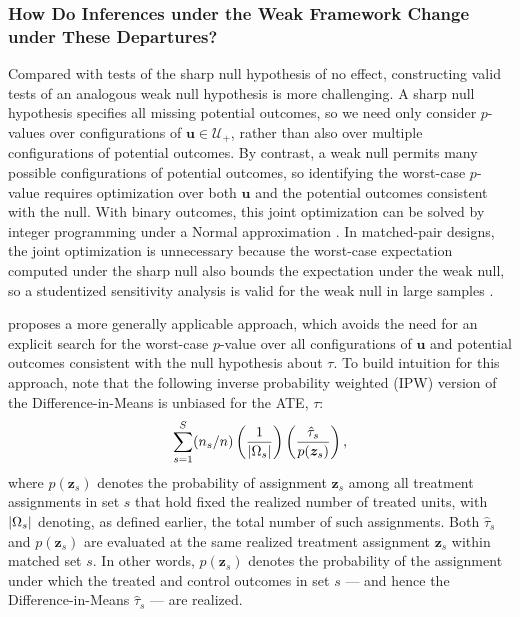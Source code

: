 \documentclass[
  12pt,
  leqno]{article}
\DeclarePairedDelimiter\abs{\lvert}{\rvert}
\begin{document}
\subsubsection{How Do Inferences under the Weak Framework Change under
These
Departures?}\label{how-do-inferences-under-the-weak-framework-change-under-these-departures}

Compared with tests of the sharp null hypothesis of no effect,
constructing valid tests of an analogous weak null hypothesis is more
challenging. A sharp null hypothesis specifies all missing potential
outcomes, so we need only consider \(p\)-values over configurations of
\(\bm{u} \in \mathcal{U}_{+}\), rather than also over multiple
configurations of potential outcomes. By contrast, a weak null permits
many possible configurations of potential outcomes, so identifying the
worst-case \(p\)-value requires optimization over both \(\bm{u}\) and
the potential outcomes consistent with the null. With binary outcomes,
this joint optimization can be solved by integer programming under a
Normal approximation \citep{fogartyetal2017}. In matched-pair designs,
the joint optimization is unnecessary because the worst-case expectation
computed under the sharp null also bounds the expectation under the weak
null, so a studentized sensitivity analysis is valid for the weak null
in large samples \citep{fogarty2020}.

\citet{fogarty2023} proposes a more generally applicable approach, which
avoids the need for an explicit search for the worst-case \(p\)-value
over all configurations of \(\bm{u}\) and potential outcomes consistent
with the null hypothesis about \(\tau\). To build intuition for this
approach, note that the following inverse probability weighted (IPW)
version of the Difference-in-Means is unbiased for the ATE, \(\tau\):
\begin{align} \label{eq: weighted diff-in-means}
\sum \limits_{s = 1}^S (n_s/n) \left(\frac{1}{\abs{\Omega_s}}\right)\left(\frac{\hat{\tau}_s}{p(\bm{z}_s)}\right),
\end{align} where \(p(\bm{z}_s)\) denotes the probability of assignment
\(\bm{z}_s\) among all treatment assignments in set \(s\) that hold
fixed the realized number of treated units, with \(\abs{\Omega_s}\)
denoting, as defined earlier, the total number of such assignments. Both
\(\hat{\tau}_s\) and \(p(\bm{z}_s)\) are evaluated at the same realized
treatment assignment \(\bm{z}_s\) within matched set \(s\). In other
words, \(p(\bm{z}_s)\) denotes the probability of the assignment under
which the treated and control outcomes in set \(s\) --- and hence the
Difference-in-Means \(\hat{\tau}_s\) --- are realized.
\end{document}
